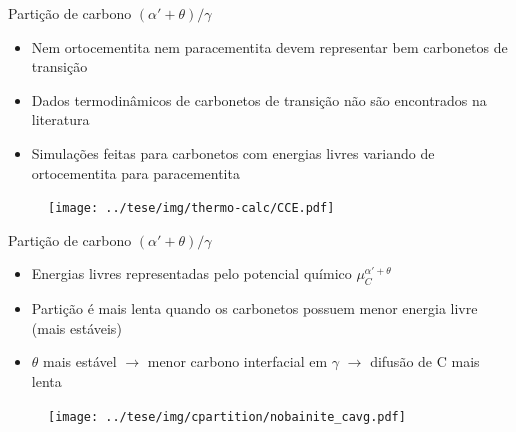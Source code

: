 \begin{frame}{Partição de carbono $(\alpha' + \theta)/\gamma$}
  \begin{itemize}
    \item Nem ortocementita nem paracementita devem representar bem carbonetos de transição
    \item Dados termodinâmicos de carbonetos de transição não são encontrados na literatura
    \item Simulações feitas para carbonetos com energias livres variando de ortocementita para paracementita
  \end{itemize}

  \begin{figure}
    \texttt{[image: ../tese/img/thermo-calc/CCE.pdf]}
  \end{figure}
\end{frame}

\begin{frame}{Partição de carbono $(\alpha' + \theta)/\gamma$}
    \begin{itemize}
      \item Energias livres representadas pelo potencial químico $\mu_C^{\alpha' + \theta}$
      \item Partição é mais lenta quando os carbonetos possuem menor energia livre (mais estáveis)
      \item $\theta$ mais estável $\rightarrow$ menor carbono interfacial em $\gamma$ $\rightarrow$ difusão de C mais lenta
    \end{itemize}

  \begin{figure}
    \texttt{[image: ../tese/img/cpartition/nobainite\_cavg.pdf]}
  \end{figure}
\end{frame}


